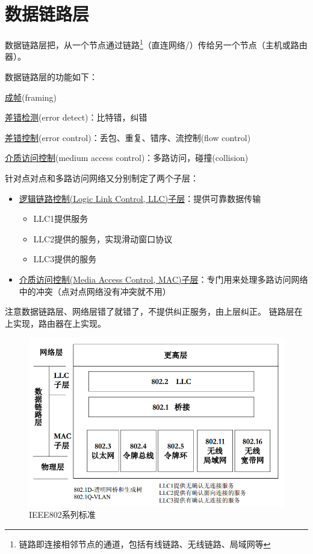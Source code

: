
\section{数据链路层}
数据链路层把，从一个节点通过链路\footnote{链路即连接相邻节点的通道，包括有线链路、无线链路、局域网等}（直连网络/）传给另一个节点（主机或路由器）。

\bigskip
数据链路层的功能如下：
\begin{partlist}
	\item \underline{成帧}(framing)
	\item \underline{差错检测}(error detect)：比特错，纠错
	\item \underline{差错控制}(error control)：丢包、重复、错序、流控制(flow control)
	\item \underline{介质访问控制}(medium access control)：多路访问，碰撞(collision)
\end{partlist}

\bigskip
针对点对点和多路访问网络又分别制定了两个子层：
\begin{itemize}
	\item \underline{逻辑链路控制(Logic Link Control, LLC)子层}：提供可靠数据传输
	\begin{itemize}
		\item LLC1提供服务
		\item LLC2提供的服务，实现滑动窗口协议
		\item LLC3提供的服务
	\end{itemize}
	\item \underline{介质访问控制(Media Access Control, MAC)子层}：专门用来处理多路访问网络中的冲突（点对点网络没有冲突就不用）
\end{itemize}

注意数据链路层、网络层错了就错了，不提供纠正服务，由上层纠正。
链路层在上实现，路由器在上实现。

\begin{figure}[H]
	\centering
	\includegraphics[width=0.65\linewidth]{fig/ieee802.PNG}
	\caption*{IEEE802系列标准}
\end{figure}

